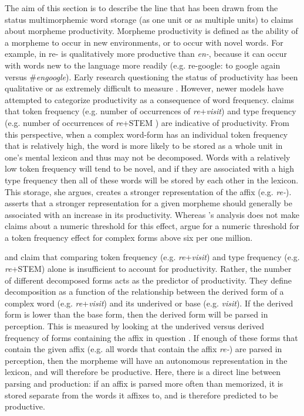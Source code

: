 \documentclass[output=paper,modfonts]{langscibook}
\begin{document}
The aim of this section is to describe the line that has been drawn from the status multimorphemic word storage (as one unit or as multiple units) to claims about morpheme productivity. Morpheme productivity is defined as the ability of a morpheme to occur in new environments, or to occur with novel words. For example, in  re- is qualitatively more productive than \textit{en-}, because it can occur with words new to the language more readily (e.g. re-google: to google again versus \#\textit{engoogle}). Early research questioning the status of productivity has been qualitative \citep{Schultnik1961} or as extremely difficult to measure \citep{Aronoff1976}. However, newer models have attempted to categorize productivity as a consequence of word frequency. \citet{Bybee1995} claims that token frequency (e.g. number of occurrences of \textit{re}+\textit{visit}) and type frequency (e.g. number of occurrences of \textit{re}+STEM ) are indicative of productivity. From this perspective, when a complex word-form has an individual token frequency that is relatively high, the word is more likely to be stored as a whole unit in one’s mental lexicon and thus may not be decomposed. Words with a relatively low token frequency will tend to be novel, and if they are associated with a high type frequency then all of these words will be stored by each other in the lexicon. This storage, she argues, creates a stronger representation of the affix (e.g. \textit{re-}). \citeauthor{Bybee1995} asserts that a stronger representation for a given morpheme should generally be associated with an increase in its productivity. Whereas \citeauthor{Bybee1995}’s analysis does not make claims about a numeric threshold for this effect, \citet{Alegre1999} argue for a numeric threshold for a token frequency effect for complex forms above six per one million.

\citet{Baayen1992} and \citet{HayBaayen2002} claim that comparing token frequency (e.g. \textit{re}+\textit{visit}) and type frequency (e.g. \textit{re}+STEM) alone is insufficient to account for productivity. Rather, the number of different decomposed forms acts as the predictor of productivity. They define decomposition as a function of the relationship between the derived form of a complex word (e.g. \textit{re}+\textit{visit}) and its underived or base (e.g. \textit{visit}). If the derived form is lower than the base form, then the derived form will be parsed in perception. This is measured by looking at the underived versus derived frequency of forms containing the affix in question \citep{Hay2002}. If enough of these forms that contain the given affix (e.g. all words that contain the affix \textit{re-}) are parsed in perception, then the morpheme will have an autonomous representation in the lexicon, and will therefore be productive. Here, there is a direct line between parsing and production: if an affix is parsed more often than memorized, it is stored separate from the words it affixes to, and is therefore predicted to be productive.
\end{document}
